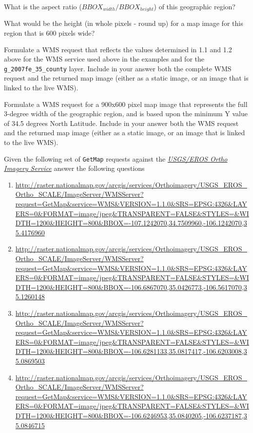 \documentclass[]{book}
\providecommand{\tightlist}{%
  \setlength{\itemsep}{0pt}\setlength{\parskip}{0pt}}
\begin{document}
\begin{description}
\tightlist
\item[Question 1]
What is the aspect ratio (\(BBOX_{width}/BBOX_{height}\)) of this
geographic region?
\item[Question 2]
What would be the height (in whole pixels - round up) for a map image
for this region that is 600 pixels wide?
\item[Question 3]
Formulate a WMS request that reflects the values determined in 1.1 and
1.2 above for the WMS service used above in the examples and for the
\texttt{g\_2007fe\_35\_county} layer. Include in your answer both the
complete WMS request and the returned map image (either as a static
image, or an image that is linked to the live WMS).
\item[Question 4]
Formulate a WMS request for a 900x600 pixel map image that represents
the full 3-degree width of the geographic region, and is based upon the
minimum Y value of 34.5 degrees North Latitude. Include in your answer
both the WMS request and the returned map image (either as a static
image, or an image that is linked to the live WMS).
\end{description}

Given the following set of \texttt{GetMap} requests against the
\emph{\href{http://raster.nationalmap.gov/arcgis/rest/services/Orthoimagery/USGS_EROS_Ortho_SCALE/ImageServer}{USGS/EROS
Ortho Imagery Service}} answer the following questions

\begin{enumerate}
\def\labelenumi{\arabic{enumi})}
\item
  \url{http://raster.nationalmap.gov/arcgis/services/Orthoimagery/USGS_EROS_Ortho_SCALE/ImageServer/WMSServer?request=GetMap\&service=WMS\&VERSION=1.1.0\&SRS=EPSG:4326\&LAYERS=0\&FORMAT=image/jpeg\&TRANSPARENT=FALSE\&STYLES=\&WIDTH=1200\&HEIGHT=800\&BBOX=-107.1242070,34.7509960,-106.1242070,35.4176960}
\item
  \url{http://raster.nationalmap.gov/arcgis/services/Orthoimagery/USGS_EROS_Ortho_SCALE/ImageServer/WMSServer?request=GetMap\&service=WMS\&VERSION=1.1.0\&SRS=EPSG:4326\&LAYERS=0\&FORMAT=image/jpeg\&TRANSPARENT=FALSE\&STYLES=\&WIDTH=1200\&HEIGHT=800\&BBOX=-106.6867070,35.0426773,-106.5617070,35.1260148}
\item
  \url{http://raster.nationalmap.gov/arcgis/services/Orthoimagery/USGS_EROS_Ortho_SCALE/ImageServer/WMSServer?request=GetMap\&service=WMS\&VERSION=1.1.0\&SRS=EPSG:4326\&LAYERS=0\&FORMAT=image/jpeg\&TRANSPARENT=FALSE\&STYLES=\&WIDTH=1200\&HEIGHT=800\&BBOX=-106.6281133,35.0817417,-106.6203008,35.0869503}
\item
  \url{http://raster.nationalmap.gov/arcgis/services/Orthoimagery/USGS_EROS_Ortho_SCALE/ImageServer/WMSServer?request=GetMap\&service=WMS\&VERSION=1.1.0\&SRS=EPSG:4326\&LAYERS=0\&FORMAT=image/jpeg\&TRANSPARENT=FALSE\&STYLES=\&WIDTH=1200\&HEIGHT=800\&BBOX=-106.6246953,35.0840205,-106.6237187,35.0846715}
\end{enumerate}
\end{document}
